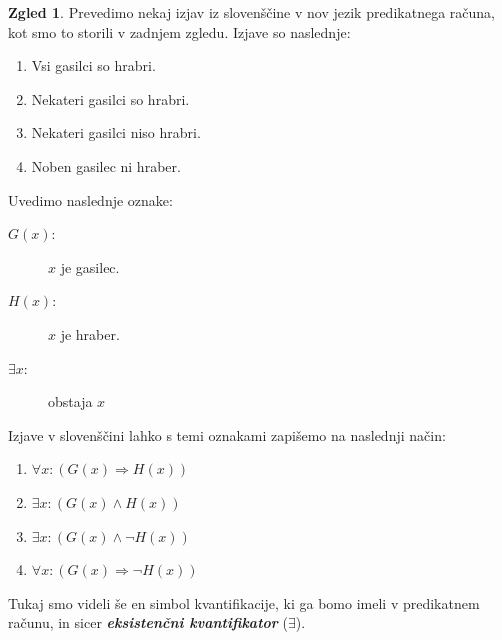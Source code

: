 \documentclass[11pt]{book}
\def\definicija{\color{rdeca}\bf\em}
\theoremstyle{definition}
\theoremstyle{zgled}
\newtheorem*{zgled}{Zgled}
\theoremstyle{odprtproblem}
\theoremstyle{domacanaloga}
\theoremstyle{izrek}
\begin{document}
\begin{zgled}
Prevedimo nekaj izjav iz slovenščine v nov jezik predikatnega računa, kot smo to storili v zadnjem zgledu. Izjave so naslednje:

\begin{enumerate}
    \item Vsi gasilci so hrabri.
    \item Nekateri gasilci so hrabri.
    \item Nekateri gasilci niso hrabri.
    \item Noben gasilec ni hraber.
\end{enumerate}

Uvedimo naslednje oznake:

\begin{description}
    \item[$G(x)$:] $x$ je gasilec.
    \item[$H(x)$:] $x$ je hraber.
    \item[$\exists x$:] obstaja $x$
\end{description}

Izjave v slovenščini lahko s temi oznakami zapišemo na naslednji način:

\begin{enumerate}
    \item $\forall x \colon (G(x) \Rightarrow H(x))$
    \item $\exists x \colon (G(x) \land H(x))$
    \item $\exists x \colon (G(x) \land \lnot H(x))$
    \item $\forall x \colon (G(x) \Rightarrow \lnot H(x))$
\end{enumerate}

Tukaj smo videli še en simbol kvantifikacije, ki ga bomo imeli v predikatnem računu, in sicer {\definicija eksistenčni kvantifikator} ($\exists$).
\end{zgled}
\end{document}
